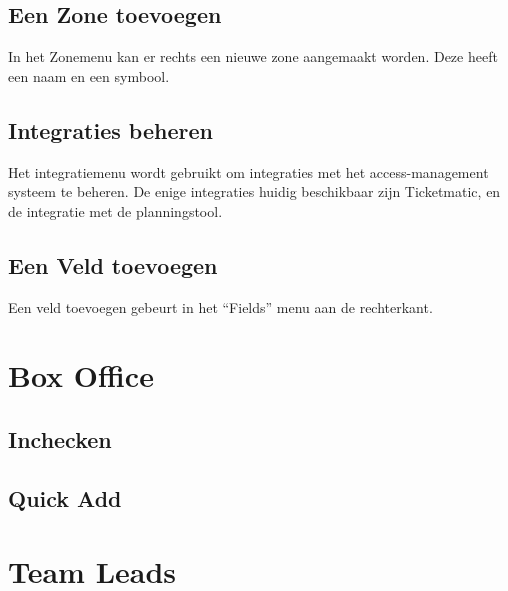 \documentclass[]{memoir}
\begin{document}
\subsection{Een Zone toevoegen} \label{SetZone}
In het Zonemenu kan er rechts een nieuwe zone aangemaakt worden. Deze heeft een naam en een symbool.
\subsection{Integraties beheren} \label{SetIntegration}
Het integratiemenu wordt gebruikt om integraties met het access-management systeem te beheren. De enige integraties huidig beschikbaar zijn Ticketmatic, en de integratie met de planningstool.
\subsection{Een Veld toevoegen} \label{SetField}
Een veld toevoegen gebeurt in het ``Fields'' menu aan de rechterkant.

\section{Box Office} \label{BoxOfficeInstr}
\subsection{Inchecken} \label{BOCheckIn}
\subsection{Quick Add} \label{BOQuickAdd}

\section{Team Leads} \label{TeamLeadInstr}
\end{document}
